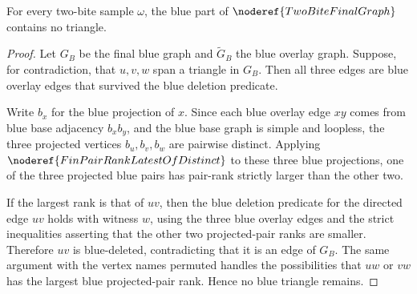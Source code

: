 \begin{helper}
For every two-bite sample \(\omega\), the blue part of
\(\noderef{TwoBiteFinalGraph}\) contains no triangle.
\end{helper}
\begin{proof}
Let \(G_B\) be the final blue graph and \(\widetilde G_B\) the blue overlay
graph.  Suppose, for contradiction, that \(u,v,w\) span a triangle in \(G_B\).
Then all three edges are blue overlay edges that survived the blue deletion
predicate.

Write \(b_x\) for the blue projection of \(x\).  Since each blue overlay edge
\(xy\) comes from blue base adjacency \(b_xb_y\), and the blue base graph is
simple and loopless, the three projected vertices \(b_u,b_v,b_w\) are pairwise
distinct.  Applying \(\noderef{FinPairRankLatestOfDistinct}\) to these three
blue projections, one of the three projected blue pairs has pair-rank strictly
larger than the other two.

If the largest rank is that of \(uv\), then the blue deletion predicate for
the directed edge \(uv\) holds with witness \(w\), using the three blue overlay
edges and the strict inequalities asserting that the other two projected-pair
ranks are smaller.  Therefore \(uv\) is blue-deleted, contradicting that it is
an edge of \(G_B\).  The same argument with the vertex names permuted handles
the possibilities that \(uw\) or \(vw\) has the largest blue projected-pair
rank.  Hence no blue triangle remains.
\end{proof}
